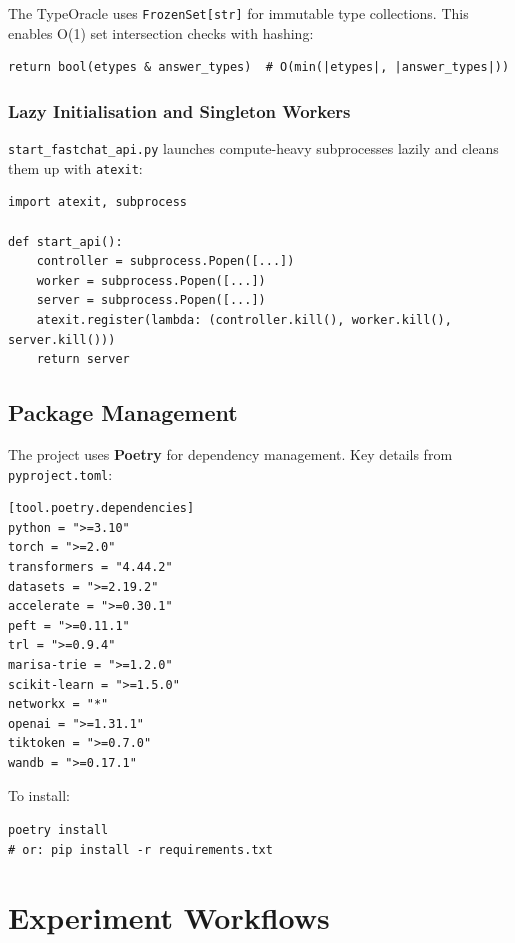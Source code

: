 \documentclass[11pt,a4paper,oneside,openany]{book}
\theoremstyle{definition}
\newcommand{\code}[1]{\texttt{#1}}
\newcommand{\file}[1]{\texttt{#1}}
\begin{document}
The TypeOracle uses \code{FrozenSet[str]} for immutable type collections. This enables O(1) set intersection checks with hashing:

\begin{lstlisting}
return bool(etypes & answer_types)  # O(min(|etypes|, |answer_types|))
\end{lstlisting}

\subsection{Lazy Initialisation and Singleton Workers}

\file{start\_fastchat\_api.py} launches compute-heavy subprocesses lazily and cleans them up with \code{atexit}:

\begin{lstlisting}
import atexit, subprocess

def start_api():
    controller = subprocess.Popen([...])
    worker = subprocess.Popen([...])
    server = subprocess.Popen([...])
    atexit.register(lambda: (controller.kill(), worker.kill(), server.kill()))
    return server
\end{lstlisting}

\section{Package Management}

The project uses \textbf{Poetry} for dependency management. Key details from \file{pyproject.toml}:

\begin{lstlisting}[numbers=none]
[tool.poetry.dependencies]
python = ">=3.10"
torch = ">=2.0"
transformers = "4.44.2"
datasets = ">=2.19.2"
accelerate = ">=0.30.1"
peft = ">=0.11.1"
trl = ">=0.9.4"
marisa-trie = ">=1.2.0"
scikit-learn = ">=1.5.0"
networkx = "*"
openai = ">=1.31.1"
tiktoken = ">=0.7.0"
wandb = ">=0.17.1"
\end{lstlisting}

To install:
\begin{lstlisting}[numbers=none,frame=none]
poetry install
# or: pip install -r requirements.txt
\end{lstlisting}

\chapter{Experiment Workflows}\label{ch:workflows}
\end{document}
